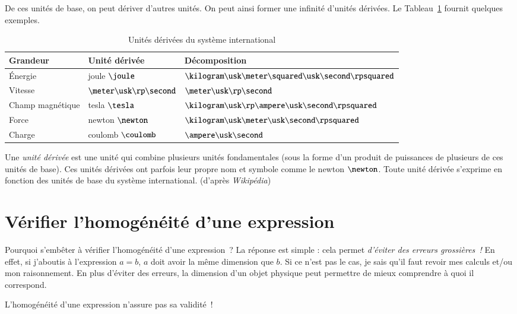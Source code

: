 \documentclass[12pt]{book}
\begin{document}
De ces unités de base, on peut dériver d'autres unités. On peut ainsi former une
infinité d'unités dérivées. Le Tableau~\ref{usi_deriv} fournit quelques exemples.

\begin{table}[ht!]
	\centering
	\caption{Unités dérivées du système international}
	\begin{tabular}{lll}
		\textbf{Grandeur} & \textbf{Unité dérivée} & \textbf{Décomposition}\\ \hline
		Énergie & joule $\joule$ & $\kilogram \usk \meter \squared \usk \second \rpsquared$\\
		Vitesse &  $\meter \usk \rp \second$ & $\meter \usk \rp \second$\\
		Champ magnétique & tesla $\tesla$ & $\kilogram \usk \rp \ampere \usk \second \rpsquared$ \\ 
		Force & newton $\newton$  & $\kilogram \usk \meter \usk \second \rpsquared$ \\
		Charge & coulomb $\coulomb$ &  $\ampere \usk \second$
	\end{tabular}
	\label{usi_deriv}
\end{table}

\begin{defn}
Une \emph{unité dérivée} est une unité qui combine plusieurs unités fondamentales
(sous la forme d'un produit de puissances de plusieurs de ces unités de base).
Ces unités dérivées ont parfois leur propre nom et symbole comme le newton
$\newton$. Toute unité dérivée s'exprime en fonction des unités de base du système 
international. (d'après \textit{Wikipédia})

\end{defn}


\section{Vérifier l'homogénéité d'une expression}
Pourquoi s'embêter à vérifier l'homogénéité d'une expression~?
La réponse est simple : cela permet \emph{d'éviter des erreurs grossières~!} En effet,
si j'aboutis à l'expression $a = b$, $a$ doit avoir la même dimension que $b$. 
Si ce n'est pas le cas, je sais qu'il faut revoir mes calculs et/ou mon raisonnement.
En plus d'éviter des erreurs, la dimension d'un objet physique 
peut permettre de mieux comprendre à quoi il correspond. 

\begin{attention}
	L'homogénéité d'une expression n'assure pas sa validité~!
\end{attention}
\end{document}
